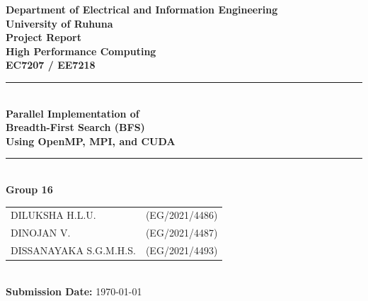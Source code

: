 \documentclass[12pt, a4paper]{article}
\begin{document}
\begin{titlepage}
    \centering
    \vspace*{1cm}
    {\large \textbf{Department of Electrical and Information Engineering}}\\[0.2cm]
    {\large \textbf{University of Ruhuna}}\\[1.5cm]
    {\Large \textbf{Project Report}}\\[0.5cm]
    {\Large \textbf{High Performance Computing}}\\[0.5cm]
    {\large \textbf{EC7207 / EE7218}}\\[1.5cm]
    \rule{\textwidth}{0.4mm}\\[0.6cm]
    {\Huge \bfseries Parallel Implementation of\\Breadth-First Search (BFS)\\[0.4cm]
    Using OpenMP, MPI, and CUDA}\\[0.6cm]
    \rule{\textwidth}{0.4mm}\\[1.5cm]
    {\large \textbf{Group 16}}\\[0.8cm]
    \begin{tabular}{ll}
        DILUKSHA H.L.U. & (EG/2021/4486) \\
        DINOJAN V. & (EG/2021/4487) \\
        DISSANAYAKA S.G.M.H.S. & (EG/2021/4493) \\
    \end{tabular}\\[1.5cm]
    {\large \textbf{Submission Date:} \today}
    \vfill
\end{titlepage}

\begin{abstract}
This report presents the parallelization of the Breadth-First Search (BFS) graph traversal algorithm using shared-memory (OpenMP), distributed-memory (MPI), hierarchical hybrid (MPI + OpenMP), and GPU acceleration (CUDA) models. We implement and evaluate five versions of the algorithm: a serial baseline, an OpenMP version with thread-local buffers, an MPI version with vertex block partitioning, a Hybrid version combining rank partitions and loop threading, and a CUDA GPU version utilizing Compressed Sparse Row (CSR) graph flattening. Execution correctness is validated by calculating the Root Mean Square Error (RMSE) of distance arrays against the serial reference, with all versions achieving an RMSE of exactly $0.000000$. Performance measurements conducted on Google Colab across a synthetic graph ($V = 30,000$) show that MPI achieved a speedup of $72.52\times$ and CUDA achieved $177.67\times$. Amdahl's Law analysis reveals a parallelizable fraction of $p \approx 89.4\%$, capping the theoretical CPU thread speedup at $9.43\times$.
\end{abstract}
\end{document}

